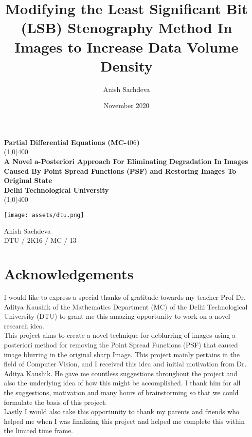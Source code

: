 \documentclass{article}
\title{Modifying the Least Significant Bit (LSB) Stenography Method In Images to Increase Data Volume Density}
\author{Anish Sachdeva}
\date{November 2020}
\begin{document}
\begin{titlepage}
\begin{center}
\vspace*{1cm}
\Large{\textbf {Partial Differential Equations (MC-$406$)}}\\
\vfill
\line(1,0){400}\\[1mm]
\huge{\textbf{A Novel a-Posteriori Approach For Eliminating Degradation In Images Caused By Point Spread Functions (PSF) and Restoring Images To Original State}}\\[3mm]
\Large{\textbf{Delhi Technological University}}\\[1mm]
\line(1,0){400}

\vfill  
\texttt{[image: assets/dtu.png]}
\vfill

Anish Sachdeva \\
DTU / 2K16 / MC / 13 \\
\end{center}
\end{titlepage}

\tableofcontents
\thispagestyle{empty}
\clearpage

\clearpage
\setcounter{page}{1}
\section{Acknowledgements}
I would like to express a special thanks of gratitude towards my teacher Prof Dr. Aditya Kaushik of the Mathematics Department (MC) of the Delhi Technological University (DTU) to grant me this amazing opportunity to work on a novel research idea. \\

This project aims to create a novel technique for deblurring of images using a-posteriori method for removing the Point Spread Functions (PSF) that caused image blurring in the original sharp Image. This project mainly pertains in the field of Computer Vision, and I received this idea and initial motivation from Dr. Aditya Kaushik. He gave me countless suggestions throughout the project and also the underlying idea of how this might be accomplished. I thank him for all the suggestions, motivation and many hours of brainstorming so that we could formulate the basis of this project.\\

Lastly I would also take this opportunity to thank my parents and friends who helped me when I was finalizing this project and helped me complete this within the limited time frame.
\end{document}
